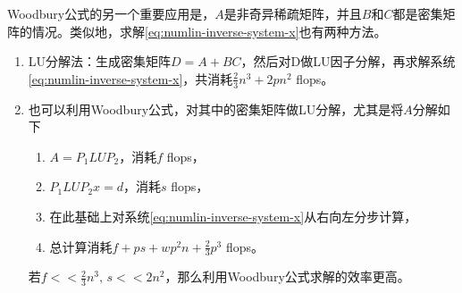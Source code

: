 Woodbury公式的另一个重要应用是，$A$是非奇异稀疏矩阵，并且$B$和$C$都是密集矩阵的情况。类似地，求解\eqref{eq:numlin-inverse-system-x}也有两种方法。
\begin{enumerate}
  \item LU分解法：生成密集矩阵$D=A+BC$，然后对D做LU因子分解，再求解系统\eqref{eq:numlin-inverse-system-x}，共消耗$\frac{2}{3} n^{3} + 2 p n^{2}$ flops。
  \item 也可以利用Woodbury公式，对其中的密集矩阵做LU分解，尤其是将$A$分解如下
  \begin{enumerate}
    \item $A = P_{1} L U P_{2}$，消耗$f$ flops，
    \item $P_{1} L U P_{2} x = d$，消耗$s$ flops，
    \item 在此基础上对系统\eqref{eq:numlin-inverse-system-x}从右向左分步计算，
    \item 总计算消耗$f + ps + w p^{2} n + \frac{2}{3} p^{3}$ flops。
  \end{enumerate}

  若$f << \frac{2}{3} n^{3}, \, s << 2 n ^{2}$，那么利用Woodbury公式求解的效率更高。
\end{enumerate}

